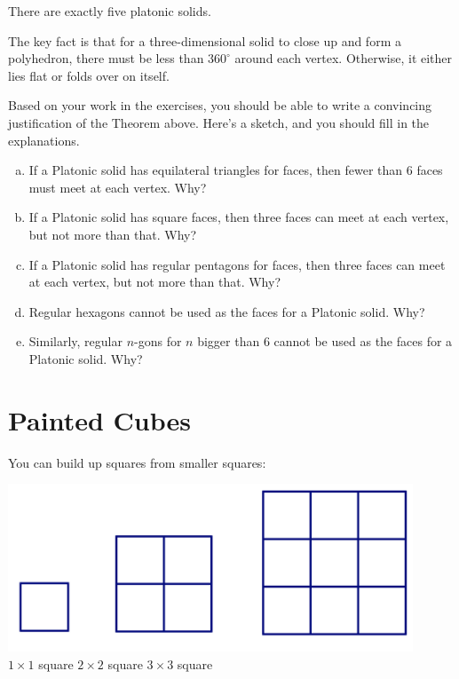 \begin{thm*}
There are exactly five platonic solids.
\end{thm*}
The key fact is that for a three-dimensional solid to close up and form a polyhedron, there must be less than $360^\circ$ around each vertex.  Otherwise, it either lies flat or folds over on itself.

\bigskip

\begin{problem}
Based on your work in the exercises, you should be able to write a convincing justification of the Theorem above.  Here's a sketch, and you should fill in the explanations.  

\begin{enumerate}[(a)]
\item
If a Platonic solid has equilateral triangles for faces, then fewer than 6 faces must meet at each vertex.  Why?\\

\item
If a Platonic solid has square faces, then three faces can meet at each vertex, but not more than that.  Why?\\

\item
If a Platonic solid has regular pentagons for faces, then three faces can meet at each vertex, but not more than that.  Why?\\

\item
Regular hexagons cannot be used as the faces for a Platonic solid.  Why?\\

\item
Similarly, regular $n$-gons for $n$ bigger than 6 cannot be used as the faces for a Platonic solid.  Why?\\

\end{enumerate}

\end{problem}



\newpage

\section{Painted Cubes}

You can build up squares from smaller squares:
\begin{center}
\includegraphics[height=5cm]{smallersqs}\\
$1\times1$ square
\qquad\quad
$2\times2$ square
\qquad\qquad\qquad\quad
$3\times3$ square
\qquad\qquad\qquad
\end{center}

